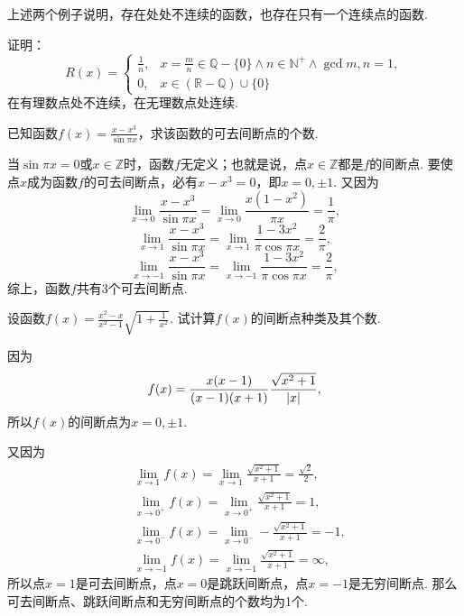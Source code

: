 上述两个例子说明，存在处处不连续的函数，也存在只有一个连续点的函数.

\begin{example}
证明：\[
	R(x) = \left\{ \begin{array}{cl}
		\frac{1}{n},
			& x=\frac{m}{n}\in\mathbb{Q}-\{0\}
				\land n\in\mathbb{N}^+
				\land \gcd{m,n}=1, \\
		0, & x\in(\mathbb{R}-\mathbb{Q})\cup\{0\}
	\end{array} \right.
\]在有理数点处不连续，在无理数点处连续.
\end{example}

\begin{example}
已知函数\(f(x) = \frac{x-x^3}{\sin \pi x}\)，求该函数的可去间断点的个数.
\begin{solution}
当\(\sin \pi x = 0\)或\(x \in \mathbb{Z}\)时，函数\(f\)无定义；也就是说，点\(x\in\mathbb{Z}\)都是\(f\)的间断点.
要使点\(x\)成为函数\(f\)的可去间断点，必有\(x-x^3=0\)，即\(x=0,\pm1\).
\def\l#1{\lim_{x\to#1}}%
又因为\[
\l{0} \frac{x-x^3}{\sin \pi x}
= \l{0} \frac{x(1-x^2)}{\pi x}
= \frac{1}{\pi},
\]\[
\l{1} \frac{x-x^3}{\sin \pi x}
= \l{1} \frac{1-3x^2}{\pi \cos \pi x}
= \frac{2}{\pi},
\]\[
\l{-1} \frac{x-x^3}{\sin \pi x}
= \l{-1} \frac{1-3x^2}{\pi \cos \pi x}
= \frac{2}{\pi},
\]综上，函数\(f\)共有3个可去间断点.
\end{solution}
\end{example}

\begin{example}
设函数\(f(x) = \frac{x^2-x}{x^2-1}\sqrt{1+\frac{1}{x^2}}\).
试计算\(f(x)\)的间断点种类及其个数.
\begin{solution}
因为\[
f(x) = \frac{x(x-1)}{(x-1)(x+1)} \frac{\sqrt{x^2+1}}{\abs{x}},
\]所以\(f(x)\)的间断点为\(x=0,\pm1\).

又因为\begin{align*}
&\lim_{x\to1} f(x)
= \lim_{x\to1} \frac{\sqrt{x^2+1}}{x+1}
= \frac{\sqrt{2}}{2}, \\
&\lim_{x\to0^+} f(x)
= \lim_{x\to0^+} \frac{\sqrt{x^2+1}}{x+1}
= 1, \\
&\lim_{x\to0^-} f(x)
= \lim_{x\to0^-} -\frac{\sqrt{x^2+1}}{x+1}
= -1, \\
&\lim_{x\to-1} f(x)
= \lim_{x\to-1} \frac{\sqrt{x^2+1}}{x+1}
= \infty,
\end{align*}
所以点\(x=1\)是可去间断点，点\(x=0\)是跳跃间断点，点\(x=-1\)是无穷间断点.
那么可去间断点、跳跃间断点和无穷间断点的个数均为1个.
\end{solution}
\end{example}

